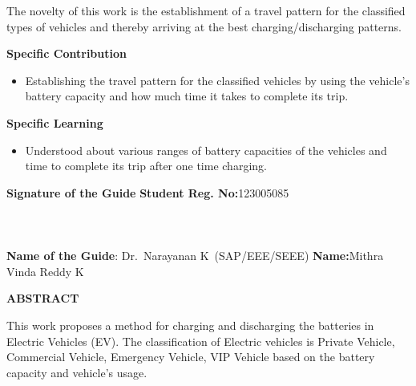 \documentclass[a4paper, 12pt, oneside]{sastra}
\begin{document}
	\noindent The novelty of this work is the establishment of a travel pattern for the classified types of vehicles and thereby arriving at the best charging/discharging patterns.
	
	
	\noindent \textbf{Specific Contribution}
	\begin{itemize}
		\item Establishing the travel pattern for the classified vehicles by using the vehicle's battery capacity and how much time it takes to complete its trip.
		
	\end{itemize}
	\noindent \textbf{Specific Learning}
	\begin{itemize}
		\item Understood about various ranges of battery capacities of the vehicles and time to complete its trip after one time charging.
	\end{itemize}
	
	\vspace*{24pt}
	
	\noindent \textbf{Signature of the Guide} \hspace*{69mm} \textbf{Student Reg. No:}123005085\\
		\\
	\\
	\\
	\noindent \textbf{Name of the Guide}:{ Dr.~Narayanan K}~(SAP/EEE/SEEE) \hspace*{7mm} \textbf{Name:}{Mithra Vinda Reddy K}
	\pagebreak
	
	\begin{center}
		\Large{{\textbf{ABSTRACT}}}
	\end{center}
	
	
	\vspace*{24pt}
	
	\noindent This work proposes a method for charging and discharging the batteries in Electric Vehicles (EV). The classification of Electric vehicles is Private Vehicle, Commercial Vehicle, Emergency Vehicle, VIP Vehicle based on the battery capacity and vehicle's usage.
	
\end{document}
